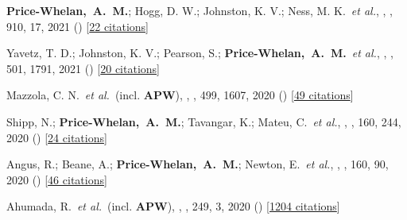\item[{\color{deemph}\scriptsize81}]\textbf{Price-Whelan,~A.~M.}; Hogg, D. W.; Johnston, K. V.; Ness, M. K.~\textit{et al.}, , \apj, 910, 17, 2021 () [\href{http://adsabs.harvard.edu/abs/2021ApJ...910...17P}{22 citations}]

\item[{\color{deemph}\scriptsize80}]Yavetz, T. D.; Johnston, K. V.; Pearson, S.; \textbf{Price-Whelan,~A.~M.}~\textit{et al.}, , \mnras, 501, 1791, 2021 () [\href{http://adsabs.harvard.edu/abs/2021MNRAS.501.1791Y}{20 citations}]

\item[{\color{deemph}\scriptsize79}]Mazzola, C. N.~\textit{et al.}~(incl. \textbf{APW}), , \mnras, 499, 1607, 2020 () [\href{http://adsabs.harvard.edu/abs/2020MNRAS.499.1607M}{49 citations}]

\item[{\color{deemph}\scriptsize78}]Shipp, N.; \textbf{Price-Whelan,~A.~M.}; Tavangar, K.; Mateu, C.~\textit{et al.}, , \aj, 160, 244, 2020 () [\href{http://adsabs.harvard.edu/abs/2020AJ....160..244S}{24 citations}]

\item[{\color{deemph}\scriptsize77}]Angus, R.; Beane, A.; \textbf{Price-Whelan,~A.~M.}; Newton, E.~\textit{et al.}, , \aj, 160, 90, 2020 () [\href{http://adsabs.harvard.edu/abs/2020AJ....160...90A}{46 citations}]

\item[{\color{deemph}\scriptsize76}]Ahumada, R.~\textit{et al.}~(incl. \textbf{APW}), , \apjs, 249, 3, 2020 () [\href{http://adsabs.harvard.edu/abs/2020ApJS..249....3A}{1204 citations}]

